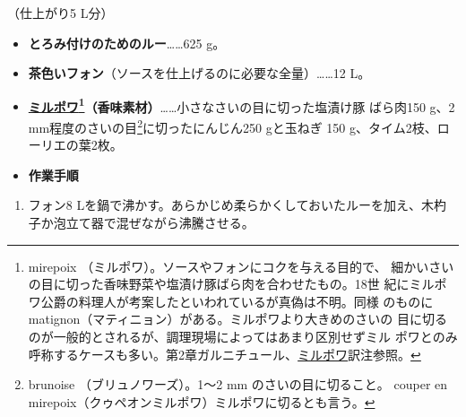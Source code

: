 \begin{recette}


（仕上がり5 L分）

\begin{itemize}
\item
  \textbf{とろみ付けのためのルー}\ldots{}\ldots{}625 g。
\item
  \textbf{茶色いフォン}（ソースを仕上げるのに必要な全量）\ldots{}\ldots{}12
  L。
\item
  \textbf{\protect\hyperlink{mirepoix}{ミルポワ}\footnote{mirepoix
    （ミルポワ）。ソースやフォンにコクを与える目的で、
    細かいさいの目に切った香味野菜や塩漬け豚ばら肉を合わせたもの。18世
    紀にミルポワ公爵の料理人が考案したといわれているが真偽は不明。同様
    のものにmatignon（マティニョン）がある。ミルポワより大きめのさいの
    目に切るのが一般的とされるが、調理現場によってはあまり区別せずミル
    ポワとのみ呼称するケースも多い。第2章ガルニチュール、\protect\hyperlink{mirepoix}{ミルポワ}訳注参照。}（香味素材）}\ldots{}\ldots{}小さなさいの目に切った塩漬け豚
  ばら肉150 g、2 mm程度のさいの目\footnote{brunoise
    （ブリュノワーズ）。1〜2 mm のさいの目に切ること。 couper en
    mirepoix（クゥペオンミルポワ）ミルポワに切るとも言う。}に切ったにんじん250
  gと玉ねぎ 150
  g、タイム2枝、ローリエの葉2枚。
\item
  \textbf{作業手順}
\end{itemize}

\begin{enumerate}
\def\labelenumi{\arabic{enumi}.}
\item
  フォン8 Lを鍋で沸かす。あらかじめ柔らかくしておいたルーを加え、木杓
  子か泡立て器で混ぜながら沸騰させる。


\end{enumerate}
\end{recette}
